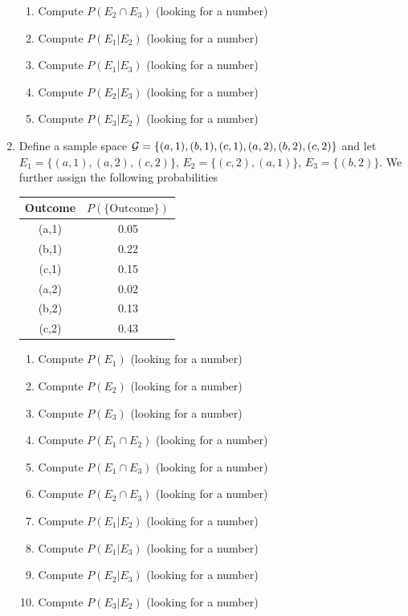 \begin{enumerate}
\begin{enumerate}
       \item Compute $P(E_{2} \cap E_{3})$ (looking for a number)
       \item Compute $P(E_{1} | E_{2})$ (looking for a number)
       \item Compute $P(E_{1} | E_{3})$ (looking for a number)
       \item Compute $P(E_{2} | E_{3})$ (looking for a number)
       \item Compute $P(E_{3} | E_{2})$ (looking for a number)
   \end{enumerate}
   \item Define a sample space $\mathcal{G} = \{ (a,1),(b,1),(c,1),(a,2),(b,2),(c,2) \}$ and let $E_{1} = \{(a,1),(a,2),(c,2)\}$, $E_{2} = \{(c,2),(a,1) \}$, $E_{3} = \{(b,2) \}$. We further assign the following probabilities 
   \begin{table}[ht!]
       \centering
       \begin{tabular}{ c c}
       Outcome &  $P(\{\text{Outcome}\})$\\
       \hline
            (a,1) & 0.05  \\
            (b,1) & 0.22 \\
            (c,1) & 0.15 \\
            (a,2) & 0.02 \\
            (b,2) & 0.13 \\
            (c,2) & 0.43 \\
       \end{tabular}
   \end{table}
   \begin{enumerate}
       \item Compute $P(E_{1})$ (looking for a number)
       \item Compute $P(E_{2})$ (looking for a number)
       \item Compute $P(E_{3})$ (looking for a number)
       \item Compute $P(E_{1} \cap E_{2})$ (looking for a number)
       \item Compute $P(E_{1} \cap E_{3})$ (looking for a number)
       \item Compute $P(E_{2} \cap E_{3})$ (looking for a number)
       \item Compute $P(E_{1} | E_{2})$ (looking for a number)
       \item Compute $P(E_{1} | E_{3})$ (looking for a number)
       \item Compute $P(E_{2} | E_{3})$ (looking for a number)
       \item Compute $P(E_{3} | E_{2})$ (looking for a number)
   \end{enumerate}
   

\end{enumerate}
